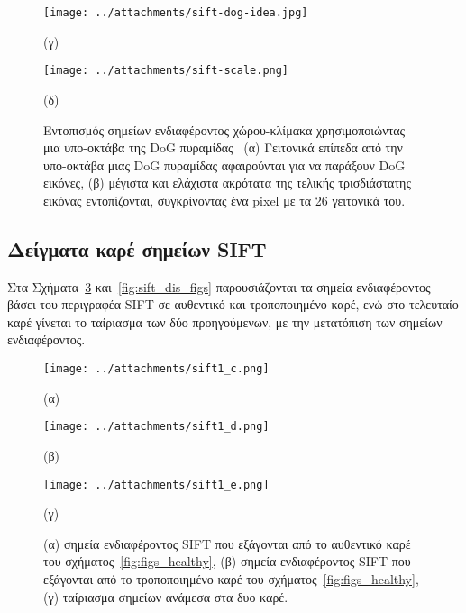 \vspace{1cm}

\begin{figure}[ht]
\begin{minipage}[b]{0.5\linewidth}
\centering
\texttt{[image: ../attachments/sift-dog-idea.jpg]}
\caption*{(γ)}
\end{minipage}
\hspace{0.9cm}
\begin{minipage}[b]{0.5\linewidth}
\centering
\texttt{[image: ../attachments/sift-scale.png]}
\caption*{(δ)}
\end{minipage}
\caption{Εντοπισμός σημείων ενδιαφέροντος χώρου-κλίμακα χρησιμοποιώντας μια υπο-οκτάβα της DoG πυραμίδας~\cite{lowe2004distinctive}
(α) Γειτονικά επίπεδα από την υπο-οκτάβα μιας DoG πυραμίδας αφαιρούνται για να παράξουν DoG εικόνες, (β) μέγιστα και ελάχιστα ακρότατα της τελικής
τρισδιάστατης εικόνας εντοπίζονται, συγκρίνοντας ένα pixel με τα 26 γειτονικά του.}
\label{fig:sift_figure4}
\end{figure} 

 
\newpage
 
  
\subsection{Δείγματα καρέ σημείων SIFT}
 
Στα Σχήματα~\ref{fig:sift_healthy_figs} και~\ref{fig:sift_dis_figs} παρουσιάζονται τα σημεία ενδιαφέροντος βάσει του περιγραφέα SIFT σε αυθεντικό και τροποποιημένο καρέ, ενώ στο τελευταίο καρέ 
γίνεται το ταίριασμα των δύο προηγούμενων, με την μετατόπιση των σημείων ενδιαφέροντος.\\


 
\begin{figure}[!ht]
\begin{minipage}[b]{0.5\linewidth}
\centering
\texttt{[image: ../attachments/sift1\_c.png]}
\caption*{(α)}
\label{fig:sift_1}
\end{minipage}
\hspace{0.9cm}
\begin{minipage}[b]{0.5\linewidth}
\centering
\texttt{[image: ../attachments/sift1\_d.png]}
\caption*{(β)}
\label{fig:sift_2}
\end{minipage}
\end{figure}  
 
\begin{figure}[!h]
\begin{minipage}[b]{1.0\linewidth}
\centering
\texttt{[image: ../attachments/sift1\_e.png]}
\caption*{(γ)}
\label{fig:sift_3}
\end{minipage}
\caption{(α) σημεία ενδιαφέροντος SIFT που εξάγονται από το αυθεντικό καρέ του σχήματος~\ref{fig:figs_healthy},
(β) σημεία ενδιαφέροντος SIFT που εξάγονται από το τροποποιημένο καρέ του σχήματος~\ref{fig:figs_healthy}, (γ) ταίριασμα σημείων ανάμεσα στα δυο καρέ.}
\label{fig:sift_healthy_figs}
\end{figure}





